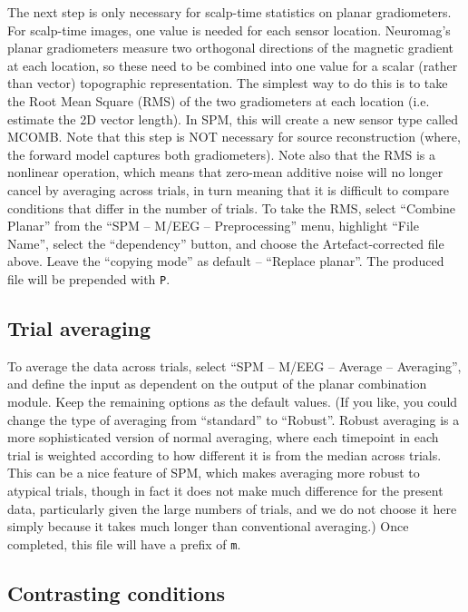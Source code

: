 The next step is only necessary for scalp-time statistics on planar gradiometers. For scalp-time images, one value is needed for each sensor location. Neuromag's planar gradiometers measure two orthogonal directions of the magnetic gradient at each location, so these need to be combined into one value for a scalar (rather than vector) topographic representation. The simplest way to do this is to take the Root Mean Square (RMS) of the two gradiometers at each location (i.e. estimate the 2D vector length). In SPM, this will create a new sensor type called MCOMB. Note that this step is NOT necessary for source reconstruction (where, the forward model captures both gradiometers). Note also that the RMS is a nonlinear operation, which means that zero-mean additive noise will no longer cancel by averaging across trials, in turn meaning that it is difficult to compare conditions that differ in the number of trials. To take the RMS, select ``Combine Planar'' from the ``SPM -- M/EEG -- Preprocessing'' menu, highlight ``File Name'', select the ``dependency'' button, and choose the Artefact-corrected file above. Leave the ``copying mode'' as default -- ``Replace planar''.  The produced file will be prepended with \texttt{P}.

\subsection{Trial averaging}

To average the data across trials, select ``SPM -- M/EEG -- Average -- Averaging'', and define the input as dependent on the output of the planar combination module. Keep the remaining options as the default values. (If you like, you could change the type of averaging from ``standard'' to ``Robust''. Robust averaging is a more sophisticated version of normal averaging, where each timepoint in each trial is weighted according to how different it is from the median across trials. This can be a nice feature of SPM, which makes averaging more robust to atypical trials, though in fact it does not make much difference for the present data, particularly given the large numbers of trials, and we do not choose it here simply because it takes much longer than conventional averaging.) Once completed, this file will have a prefix of \texttt{m}.

\subsection{Contrasting conditions}


